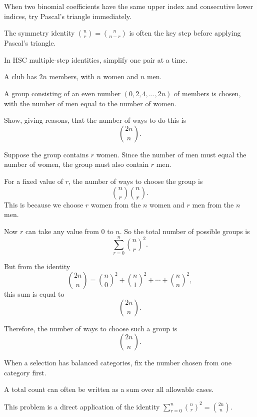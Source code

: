 \begin{takeaways}
\item When two binomial coefficients have the same upper index and consecutive lower indices, try Pascal's triangle immediately.
\item The symmetry identity $\binom{n}{r}=\binom{n}{n-r}$ is often the key step before applying Pascal's triangle.
\item In HSC multiple-step identities, simplify one pair at a time.
\end{takeaways}

\begin{problem}
A club has $2n$ members, with $n$ women and $n$ men.

A group consisting of an even number $(0,2,4,\dots,2n)$ of members is chosen, with the number of men equal to the number of women.

Show, giving reasons, that the number of ways to do this is
\[
\binom{2n}{n}.
\]
\end{problem}

\begin{solution}
Suppose the group contains $r$ women. Since the number of men must equal the number of women, the group must also contain $r$ men.

For a fixed value of $r$, the number of ways to choose the group is
\[
\binom{n}{r}\binom{n}{r}.
\]
This is because we choose $r$ women from the $n$ women and $r$ men from the $n$ men.

Now $r$ can take any value from $0$ to $n$. So the total number of possible groups is
\[
\sum_{r=0}^{n}\binom{n}{r}^2.
\]

But from the identity
\[
\binom{2n}{n}=\binom{n}{0}^2+\binom{n}{1}^2+\cdots+\binom{n}{n}^2,
\]
this sum is equal to
\[
\binom{2n}{n}.
\]

Therefore, the number of ways to choose such a group is
\[
\boxed{\binom{2n}{n}}.
\]
\end{solution}

\begin{takeaways}
\item When a selection has balanced categories, fix the number chosen from one category first.
\item A total count can often be written as a sum over all allowable cases.
\item This problem is a direct application of the identity $\sum_{r=0}^n \binom{n}{r}^2=\binom{2n}{n}$.
\end{takeaways}

